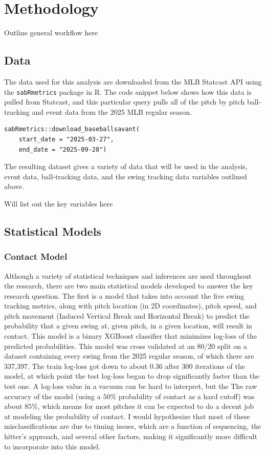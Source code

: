 \documentclass[12pt]{article}
\begin{document}
\section{Methodology}
Outline general workflow here
\subsection{Data}
The data used for this analysis are downloaded from the MLB Statcast API using the \texttt{sabRmetrics} package in R. The code snippet below shows how this data is pulled from Statcast, and this particular query pulls all of the pitch by pitch ball-tracking and event data from the 2025 MLB regular season.
\begin{verbatim}
sabRmetrics::download_baseballsavant(
    start_date = "2025-03-27", 
    end_date = "2025-09-28")
\end{verbatim}
The resulting dataset gives a variety of data that will be used in the analysis, event data, ball-tracking data, and the swing tracking data variables outlined above.

Will list out the key variables here

\subsection{Statistical Models}

\subsubsection{Contact Model}
Although a variety of statistical techniques and inferences are used throughout the research, there are two main statistical models developed to answer the key research question. The first is a model that takes into account the five swing tracking metrics, along with pitch location (in 2D coordinates), pitch speed, and pitch movement (Induced Vertical Break and Horizontal Break) to predict the probability that a given swing at, given pitch, in a given location, will result in contact. This model is a binary XGBoost classifier that minimizes log-loss of the predicted probabilities. This model was cross validated at an 80/20 split on a dataset containing every swing from the 2025 regular season, of which there are 337,397. The train log-loss got down to about $0.36$ after 300 iterations of the model, at which point the test log-loss began to drop significantly faster than the test one. A log-loss value in a vacuum can be hard to interpret, but the The raw accuracy of the model (using a $50\%$ probability of contact as a hard cutoff) was about $85\%$, which means for most pitches it can be expected to do a decent job at modeling the probability of contact. 
I would hypothesize that most of these misclassifications are due to timing issues, which are a function of sequencing, the hitter's approach, and several other factors, making it significantly more difficult to incorporate into this model.
\end{document}
